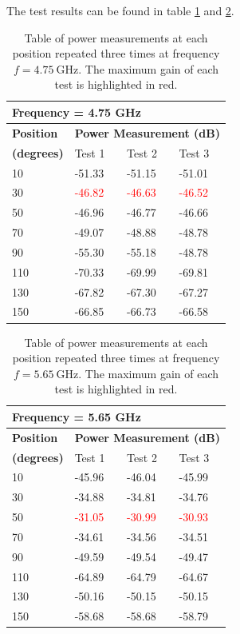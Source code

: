 The test results can be found in table \ref{tab:a2_1a} and \ref{tab:a2_1b}.
\begin{table}[H]
    \centering
    \begin{tabular}{l|l|l|l}
        \multicolumn{4}{l}{\textbf{Frequency = 4.75 GHz}}         \\
        \hline
        \textbf{Position} & \multicolumn{3}{l}{\textbf{Power Measurement (dB)}} \\
        \textbf{(degrees)}  & Test 1    & Test 2  & Test 3  \\
        \hline
        \hline
        10      & -51.33    & -51.15    & -51.01 \\
        30      & \textcolor{red}{-46.82}    & \textcolor{red}{-46.63}    & \textcolor{red}{-46.52} \\
        50      & -46.96    & -46.77    & -46.66 \\
        70      & -49.07    & -48.88    & -48.78 \\
        90      & -55.30    & -55.18    & -48.78 \\
        110     & -70.33    & -69.99    & -69.81 \\
        130     & -67.82    & -67.30    & -67.27 \\
        150     & -66.85    & -66.73    & -66.58
        \end{tabular}
    \caption{Table of power measurements at each position repeated three times at frequency $f=\SI{4.75}{\giga\hertz}$. The maximum gain of each test is highlighted in red.}
    \label{tab:a2_1a}
\end{table}

\begin{table}[H]
    \centering
    \begin{tabular}{l|l|l|l}
        \multicolumn{4}{l}{\textbf{Frequency = 5.65 GHz}}         \\
        \hline
        \textbf{Position} & \multicolumn{3}{l}{\textbf{Power Measurement (dB)}} \\
        \textbf{(degrees)}  & Test 1    & Test 2  & Test 3  \\
        \hline
        \hline
        10      & -45.96    & -46.04    & -45.99 \\
        30      & -34.88    & -34.81    & -34.76 \\
        50      & \textcolor{red}{-31.05}    & \textcolor{red}{-30.99}    & \textcolor{red}{-30.93} \\
        70      & -34.61    & -34.56    & -34.51 \\
        90      & -49.59    & -49.54    & -49.47 \\
        110     & -64.89    & -64.79    & -64.67 \\
        130     & -50.16    & -50.15    & -50.15 \\
        150     & -58.68    & -58.68    & -58.79
        \end{tabular}
    \caption{Table of power measurements at each position repeated three times at frequency $f=\SI{5.65}{\giga\hertz}$. The maximum gain of each test is highlighted in red.}
    \label{tab:a2_1b}
\end{table}

